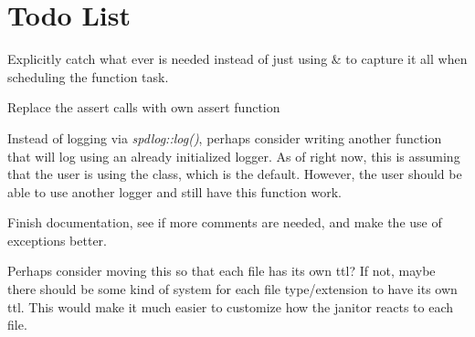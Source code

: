 \chapter{Todo List}
\hypertarget{todo}{}\label{todo}

\begin{DoxyRefList}
\item[Member \doxylink{class_atlas_1_1_atlas_engine_a62c2a14740f92ef26d39aeab583fd4e8}{Atlas\+::Atlas\+Engine\+::init\+With\+Threading} ()]\label{todo__todo000008}%
%
Explicitly catch what ever is needed instead of just using \& to capture it all when scheduling the  function task.

\label{todo__todo000009}%
%
Replace the assert calls with \textquotesingle{} own assert function  
\item[Member \doxylink{namespace_atlas_afaaad2137b7ca90a17d022d41cb33632}{Atlas\+::Default\+Vulkan\+Debug\+Callback} (Vk\+Debug\+Utils\+Message\+Severity\+Flag\+Bits\+EXT message\+Severity, Vk\+Debug\+Utils\+Message\+Type\+Flags\+EXT message\+Type, const Vk\+Debug\+Utils\+Messenger\+Callback\+Data\+EXT \texorpdfstring{$\ast$}{*}p\+Callback\+Data, void \texorpdfstring{$\ast$}{*}p\+User\+Data)]\label{todo__todo000015}%
%
Instead of logging via {\itshape spdlog\+::log()}, perhaps consider writing another function that will log using an already initialized  logger. As of right now, this is assuming that the user is using the  class, which is the default. However, the user should be able to use another logger and still have this function work.  
\item[Class \doxylink{class_atlas_1_1_fence}{Atlas\+::Fence} ]\label{todo__todo000014}%
%
Finish documentation, see if more comments are needed, and make the use of exceptions better. 
\item[Member \doxylink{struct_atlas_1_1_file_manager_1_1_options_aff07eeba01fd3d8e2a58870ff725ed4b}{Atlas\+::File\+Manager\+::Options\+::file\+TTL} ]\label{todo__todo000018}%
%
Perhaps consider moving this so that each file has its own ttl? If not, maybe there should be some kind of system for each file type/extension to have its own ttl. This would make it much easier to customize how the janitor reacts to each file.  

\end{DoxyRefList}
